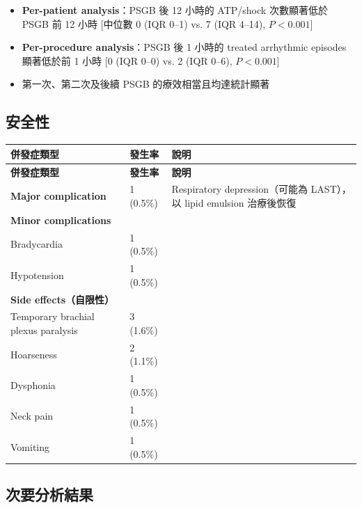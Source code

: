 \documentclass[12pt,a4paper]{article}
\begin{document}
\vspace{0.3cm}

\begin{itemize}
    \item \textbf{Per-patient analysis}：PSGB 後 12 小時的 ATP/shock 次數顯著低於 PSGB 前 12 小時 [中位數 0 (IQR 0--1) vs. 7 (IQR 4--14), $P < 0.001$]
    \item \textbf{Per-procedure analysis}：PSGB 後 1 小時的 treated arrhythmic episodes 顯著低於前 1 小時 [0 (IQR 0--0) vs. 2 (IQR 0--6), $P < 0.001$]
    \item 第一次、第二次及後續 PSGB 的療效相當且均達統計顯著
\end{itemize}

\subsection{安全性}

\begin{longtable}{p{4cm}p{3cm}p{6.5cm}}
\toprule
\textbf{併發症類型} & \textbf{發生率} & \textbf{說明} \\
\midrule
\endfirsthead

\toprule
\textbf{併發症類型} & \textbf{發生率} & \textbf{說明} \\
\midrule
\endhead

\bottomrule
\endfoot

\textbf{Major complication} & 1 (0.5\%) & Respiratory depression（可能為 LAST），以 lipid emulsion 治療後恢復 \\
\midrule
\multicolumn{3}{l}{\textbf{Minor complications}} \\
Bradycardia & 1 (0.5\%) & \\
Hypotension & 1 (0.5\%) & \\
\midrule
\multicolumn{3}{l}{\textbf{Side effects（自限性）}} \\
Temporary brachial plexus paralysis & 3 (1.6\%) & \\
Hoarseness & 2 (1.1\%) & \\
Dysphonia & 1 (0.5\%) & \\
Neck pain & 1 (0.5\%) & \\
Vomiting & 1 (0.5\%) & \\
\bottomrule
\end{longtable}

\subsection{次要分析結果}
\end{document}
